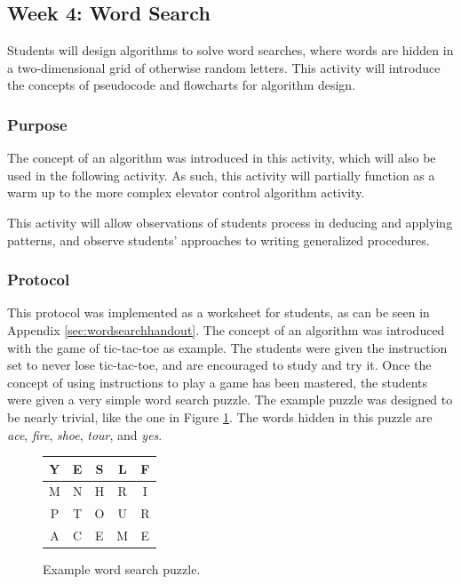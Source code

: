 \subsection{Week 4: Word Search}

	Students will design algorithms to solve word searches, where words
	are hidden in a two-dimensional grid of otherwise random letters.
	This activity will introduce the concepts of pseudocode and flowcharts
	for algorithm design.
	
	
	\subsubsection{Purpose}
	
	The concept of an algorithm was introduced in this activity, which
	will also be used in the following activity. As such, this activity
	will partially function as a warm up to the more complex elevator
	control algorithm activity. 
	
	This activity will allow observations of students process in deducing
	and applying patterns, and observe students' approaches to writing
	generalized procedures.
	
	
	\subsubsection{Protocol}
	
	This protocol was implemented as a worksheet for students, as can
	be seen in Appendix \ref{sec:wordsearchhandout}. The concept of an
	algorithm was introduced with the game of tic-tac-toe as example.
	The students were given the instruction set to never lose tic-tac-toe,
	and are encouraged to study and try it. Once the concept of using
	instructions to play a game has been mastered, the students were
	given a very simple word search puzzle. The example puzzle was
	designed to be nearly trivial, like the one in Figure \ref{fig:Example-word-search}.
	The words hidden in this puzzle are \emph{ace}, \emph{fire}, \emph{shoe},
	\emph{tour}, and \emph{yes}.
	
	\begin{center}
	\begin{figure}
	\begin{centering}
	\begin{tabular}{|c|c|c|c|c|}
	\hline 
	Y & E & S & L & F\tabularnewline
	\hline
	\hline 
	M & N & H & R & I\tabularnewline
	\hline
	\hline 
	P & T & O & U & R\tabularnewline
	\hline
	\hline 
	A & C & E & M & E\tabularnewline
	\hline
	\end{tabular}
	\par\end{centering}
	
	\caption{\label{fig:Example-word-search}Example word search puzzle.}
	
	
	
	\end{figure}
	
	\par\end{center}
	
